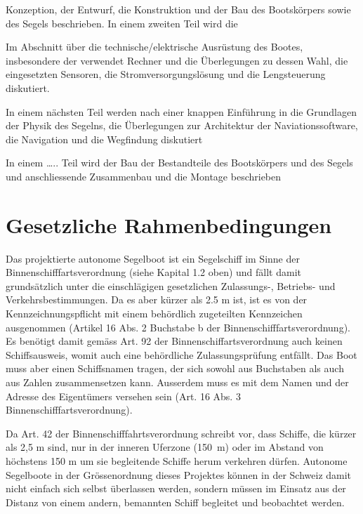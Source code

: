 Konzeption, der Entwurf, die Konstruktion und der Bau des Bootskörpers sowie des Segels beschrieben. In einem zweiten Teil wird die

  Im Abschnitt über die technische/elektrische Ausrüstung des Bootes, insbesondere der verwendet Rechner und die Überlegungen zu dessen Wahl, die eingesetzten Sensoren, die Stromversorgungslösung und die Lengsteuerung diskutiert.

 In einem nächsten Teil werden nach einer knappen Einführung in die Grundlagen der Physik des Segelns, die Überlegungen zur Architektur der Naviationssoftware, die Navigation und die Wegfindung diskutiert

 In einem ….. Teil wird der Bau der Bestandteile des Bootskörpers und des Segels und anschliessende Zusammenbau und die Montage beschrieben 

\section{Gesetzliche Rahmenbedingungen}

Das projektierte autonome Segelboot ist ein Segelschiff im Sinne der Binnenschifffartsverordnung (siehe Kapital 1.2 oben) und fällt damit grundsätzlich unter die einschlägigen gesetzlichen Zulassungs-, Betriebs- und Verkehrsbestimmungen. Da es aber kürzer als 2.5 m ist, ist es von der Kennzeichnungspflicht mit einem behördlich zugeteilten Kennzeichen ausgenommen (Artikel 16 Abs. 2 Buchstabe b der Binnenschifffartsverordnung). Es benötigt damit gemäss Art. 92 der Binnenschiffartsverordnung auch keinen Schiffsausweis, womit auch eine behördliche Zulassungsprüfung entfällt. Das Boot muss aber einen Schiffsnamen tragen, der sich sowohl aus Buchstaben als auch aus Zahlen zusammensetzen kann. Ausserdem muss es mit dem Namen und der Adresse des Eigentümers versehen sein (Art. 16 Abs. 3 Binnenschifffartsverordnung). 

Da Art. 42 der Binnenschifffahrtsverordnung schreibt vor, dass Schiffe, die kürzer als 2,5 m sind, nur in der inneren Uferzone (150 m) oder im Abstand von höchstens 150 m um sie begleitende Schiffe herum verkehren dürfen. Autonome Segelboote in der Grössenordnung dieses Projektes können in der Schweiz damit nicht einfach sich selbst überlassen werden, sondern müssen im Einsatz aus der Distanz von einem andern, bemannten Schiff  begleitet und beobachtet werden.  

